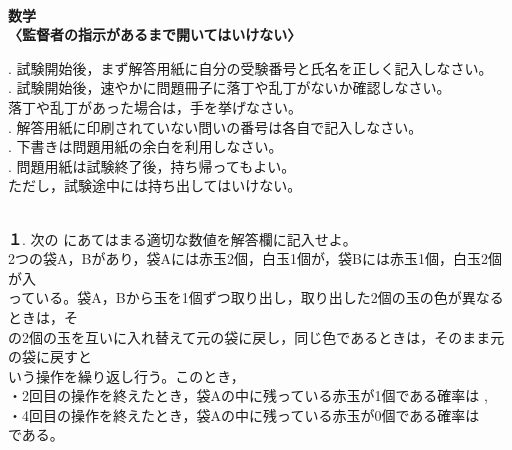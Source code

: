 \documentclass[paper=a4, fleqn]{jlreq}
\begin{document}

\begin{center}
\mbox{}\\[18mm]

\huge
{\textbf{数\qquad\quad 学}}\\[24mm]

\small
	{\textbf{〈監督者の指示があるまで開いてはいけない〉}}\\
\end{center}

\vspace{9mm}

\small

\qquad\qquad\qquad\qquad\qquad{}.\quad
試験開始後，まず解答用紙に自分の受験番号と氏名を正しく記入しなさい。\\[-2mm]

\qquad\qquad\qquad\qquad\qquad{}.\quad
試験開始後，速やかに問題冊子に落丁や乱丁がないか確認しなさい。\\[-2mm]

\qquad\qquad\qquad\qquad\qquad\qquad
\phantom{2.\;\;}
落丁や乱丁があった場合は，手を挙げなさい。\\[-2mm]

\qquad\qquad\qquad\qquad\qquad{}.\quad
解答用紙に印刷されていない問いの番号は各自で記入しなさい。\\[-2mm]

\qquad\qquad\qquad\qquad\qquad{}.\quad
下書きは問題用紙の余白を利用しなさい。\\[-2mm]

\qquad\qquad\qquad\qquad\qquad{}.\quad
問題用紙は試験終了後，持ち帰ってもよい。\\[-2mm]

\qquad\qquad\qquad\qquad\qquad\qquad
\phantom{5.\;\;}
ただし，試験途中には持ち出してはいけない。


\newpage
\mbox{}\\[6mm]

\qquad\qquad\qquad
{\LARGE\textbf{１}}.\;
\normalsize
次の \fbox{\rule{0pt}{2.0ex}\rule{0.7cm}{0pt}}
にあてはまる適切な数値を解答欄に記入せよ。\\[1.5mm]

\qquad\qquad\quad\;\;
2つの袋A，Bがあり，袋Aには赤玉2個，白玉1個が，袋Bには赤玉1個，白玉2個が入\\
\qquad\qquad\quad\;\;
っている。袋A，Bから玉を1個ずつ取り出し，取り出した2個の玉の色が異なるときは，そ\\
\qquad\qquad\quad\;\;
の2個の玉を互いに入れ替えて元の袋に戻し，同じ色であるときは，そのまま元の袋に戻すと\\
\qquad\qquad\quad\;\;
いう操作を繰り返し行う。このとき，\\[-1mm]

\qquad\qquad\quad\;\;
・2回目の操作を終えたとき，袋Aの中に残っている赤玉が1個である確率は
\;\;,\\[-2mm]

\qquad\qquad\quad\;\;
・4回目の操作を終えたとき，袋Aの中に残っている赤玉が0個である確率は
\;\;\\

\qquad\qquad\quad\;\;
である。
\end{document}
